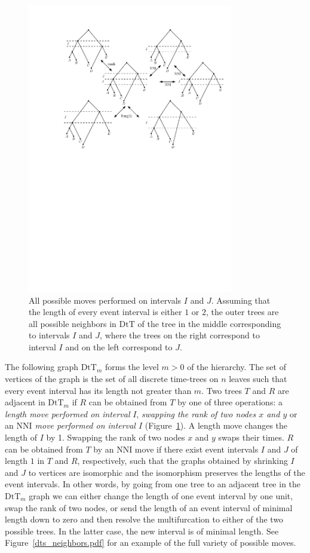 \documentclass[11pt]{amsart}
\theoremstyle{definition}
\newcommand{\nni}{\mathrm{NNI}}
\newcommand{\dtt}{\mathrm{DtT}}
\begin{document}
\begin{figure}[ht]
\centering
\includegraphics[width=0.8\textwidth]{DtT_with_rank_move_short}
\caption{All possible moves performed on intervals $I$ and $J$.
Assuming that the length of every event interval is either $1$ or $2$, the outer trees are all possible neighbors in $\dtt$ of the tree in the middle corresponding to intervals $I$ and $J$, where the trees on the right correspond to interval $I$ and on the left correspond to $J$.}
\label{DtT.pdf}
\end{figure}

The following graph $\dtt_m$ forms the level $m > 0$ of the hierarchy.
The set of vertices of the graph is the set of all discrete time-trees on $n$ leaves such that every event interval has its length not greater than $m$.
Two trees $T$ and $R$ are adjacent in $\dtt_m$ if $R$ can be obtained from $T$ by one of three operations: a \emph{length move performed on interval} $I$, \emph{swapping the rank of two nodes $x$ and $y$} or an \emph{$\nni$ move performed on interval $I$} (Figure~\ref{DtT.pdf}).
A length move changes the length of $I$ by 1.
Swapping the rank of two nodes $x$ and $y$ swaps their times.
$R$ can be obtained from $T$ by an $\nni$ move if there exist event intervals $I$ and $J$ of length $1$ in $T$ and $R$, respectively, such that the graphs obtained by shrinking $I$ and $J$ to vertices are isomorphic and the isomorphism preserves the lengths of the event intervals.
In other words, by going from one tree to an adjacent tree in the $\dtt_m$ graph we can either change the length of one event interval by one unit, swap the rank of two nodes, or send the length of an event interval of minimal length down to zero and then resolve the multifurcation to either of the two possible trees.
In the latter case, the new interval is of minimal length.
See Figure~\ref{dts_neighbors.pdf} for an example of the full variety of possible moves.
\end{document}
